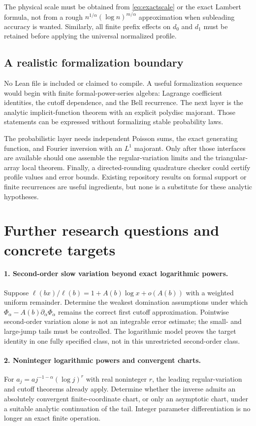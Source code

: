 \documentclass[11pt,a4paper]{article}
\numberwithin{equation}{section}
\theoremstyle{definition}\newtheorem{definition}[theorem]{Definition}
\theoremstyle{remark}\newtheorem{remark}[theorem]{Remark}
\theoremstyle{definition}
\begin{document}
The physical scale must be obtained from \eqref{eq:exactscale} or the exact
Lambert formula, not from a rough $n^{1/\alpha}(\log n)^{m/\alpha}$
approximation when subleading accuracy is wanted. Similarly, all finite
prefix effects on $d_0$ and $d_1$ must be retained before applying the
universal normalized profile.

\subsection{A realistic formalization boundary}
No Lean file is included or claimed to compile. A useful formalization
sequence would begin with finite formal-power-series algebra: Lagrange
coefficient identities, the cutoff dependence, and the Bell recurrence.
The next layer is the analytic implicit-function theorem with an explicit
polydisc majorant. Those statements can be expressed without formalizing
stable probability laws.

The probabilistic layer needs independent Poisson sums, the exact generating
function, and Fourier inversion with an $L^1$ majorant. Only after those
interfaces are available should one assemble the regular-variation limits
and the triangular-array local theorem. Finally, a directed-rounding
quadrature checker could certify profile values and error bounds.
Existing repository results on formal support or finite recurrences are
useful ingredients, but none is a substitute for these analytic hypotheses.

\section{Further research questions and concrete targets}
\label{sec:research}

\paragraph{1. Second-order slow variation beyond exact logarithmic powers.}
Suppose
$\ell(bx)/\ell(b)=1+A(b)\log x+o(A(b))$ with a weighted uniform remainder.
Determine the weakest domination assumptions under which
$\Phi_\alpha-A(b)\partial_\alpha\Phi_\alpha$ remains the correct first
cutoff approximation. Pointwise second-order variation alone is not an
integrable error estimate; the small- and large-jump tails must be controlled.
The logarithmic model proves the target identity in one fully specified
class, not in this unrestricted second-order class.

\paragraph{2. Noninteger logarithmic powers and convergent charts.}
For $a_j=a j^{-1-\alpha}(\log j)^r$ with real noninteger $r$, the leading
regular-variation and cutoff theorems already apply. Determine whether the
inverse admits an absolutely convergent finite-coordinate chart, or only
an asymptotic chart, under a suitable analytic continuation of the tail.
Integer parameter differentiation is no longer an exact finite operation.
\end{document}
